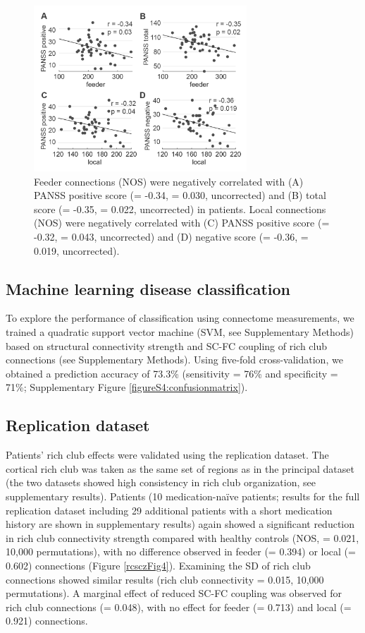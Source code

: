 \begin{refsection}
\begin{figure}[H]
\centering
  \includegraphics[width=8cm]{images/rcsczFig3.png}
  \caption{Feeder connections (NOS) were negatively correlated with (A) PANSS positive score (\rval = -0.34, \pval = 0.030, uncorrected) and (B) total score (\rval = -0.35, \pval = 0.022, uncorrected) in patients. Local connections (NOS) were negatively correlated with (C) PANSS positive score (\rval = -0.32, \pval = 0.043, uncorrected) and (D) negative score (\rval = -0.36, \pval = 0.019, uncorrected).}
  \label{rcsczFig3}
\end{figure}

\subsection*{Machine learning disease classification}
To explore the performance of classification using connectome measurements, we trained a quadratic support vector machine (SVM, see Supplementary Methods) based on structural connectivity strength and SC-FC coupling of rich club connections (see Supplementary Methods). Using five-fold cross-validation, we obtained a prediction accuracy of 73.3\% (sensitivity = 76\% and specificity = 71\%; Supplementary Figure \ref{figureS4:confusionmatrix}).

\subsection*{Replication dataset}
Patients' rich club effects were validated using the replication dataset. The cortical rich club was taken as the same set of regions as in the principal dataset (the two datasets showed high consistency in rich club organization, see supplementary results). Patients (10 medication-na\"{i}ve patients; results for the full replication dataset including 29 additional patients with a short medication history are shown in supplementary results) again showed a significant reduction in rich club connectivity strength compared with healthy controls (NOS, \pval = 0.021, 10,000 permutations), with no difference observed in feeder (\pval = 0.394) or local (\pval = 0.602) connections (Figure \ref{rcsczFig4}). Examining the SD of rich club connections showed similar results (rich club connectivity \pval = 0.015, 10,000 permutations). A marginal effect of reduced SC-FC coupling was observed for rich club connections (\pval = 0.048), with no effect for feeder (\pval = 0.713) and local (\pval = 0.921) connections.


\end{refsection}
